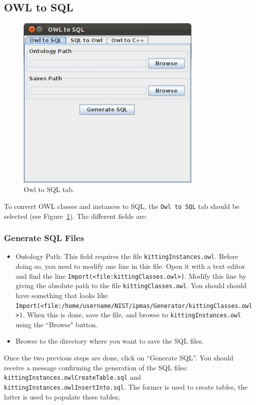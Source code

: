 \documentclass[12pt]{article}
\begin{document}
\subsection{OWL to SQL}
\begin{figure}[h!t!]
\centering
\includegraphics[width=9cm]{Figure/OWLtoSQL001.jpeg}
\caption{Owl to SQL tab.}
\label{fig:owl2sql}
\end{figure}
To convert OWL classes and instances to SQL, the \texttt{Owl to SQL} tab should be selected (see Figure~\ref{fig:owl2sql}). The different fields are:

\subsubsection{Generate SQL Files}
\begin{itemize}
 \item Ontology Path: This field requires the file \texttt{kittingInstances.owl}. Before doing so, you need to modify one line in this file. Open it with a text editor and find the line \texttt{Import(<file:kittingClasses.owl>)}. Modify
this line by giving the absolute path to the file \texttt{kittingClasses.owl}. You should should have something that looks like \texttt{Import(<file:/home/username/NIST/ipmas/Generator/kittingClasses.owl>)}. When this is done, save the file, and browse to  \texttt{kittingInstances.owl} using the ``Browse" button.
 \item Browse to the directory where you want to save the SQL files.
\end{itemize}

Once the two previous steps are done, click on ``Generate SQL''. You should receive a message confirming the generation of the SQL files: \texttt{kittingInstances.owlCreateTable.sql} and \texttt{kittingInstances.owlInsertInto.sql}. The former is used to create tables, the latter is used to populate these tables;
\end{document}
